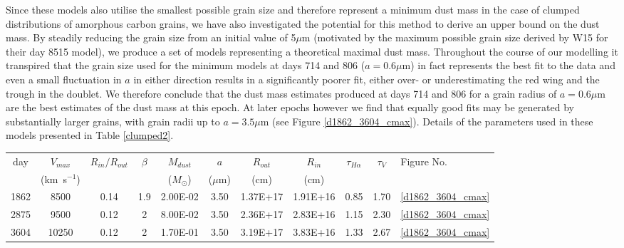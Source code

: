 Since these models also utilise the smallest possible grain size and 
therefore represent a minimum dust mass in the case of 
clumped distributions of amorphous carbon grains, we have also investigated the 
potential for this method to derive an upper bound on the dust mass.  By 
steadily reducing the grain size from an initial value of 5$\mu$m 
(motivated by the maximum possible grain size derived by W15 for their day 
8515 model), we produce a set of models representing a theoretical maximal 
dust mass.  Throughout the course of our modelling it transpired that the 
grain size used for the minimum models at days 714 and 806 ($a=0.6\mu$m) 
in fact represents the best fit to the data and even a small fluctuation 
in $a$ in either direction results in a significantly poorer fit, either 
over- or underestimating the red wing and the trough in the doublet.  We 
therefore conclude that the dust mass estimates produced at days 714 and 
806 for a grain radius of $a=0.6\mu$m are the best estimates of the dust mass 
at this epoch.  At later epochs however we find that equally good fits may 
be generated by substantially larger grains, with grain radii up to $a=3.5\mu$m (see Figure 
\ref{d1862_3604_cmax}).  Details of the parameters used in these models 
presented in Table \ref{clumped2}.



\begin{table*}
	\begin{minipage}{180mm}
	\caption{Details of the parameters used for the best fitting clumped models with $a=3.5\mu$m.}
	\label{clumped2}
	\begin{center}
  	\begin{tabular}{@{} ccccccccccl @{}}
    	\hline
  day & $V_{max}$ & $R_{in}/R_{out}$ & $\beta$ & $M_{dust}$ & $a$ & $R_{out}$ & $R_{in}$ & $\tau_{H\alpha}$ & $\tau_V$ & Figure No. \\
	& (km~s$^{-1} $) & & & ($M_{\odot}$) & ($\mu$m) & (cm) & (cm)  \\
	\hline
1862 & 8500 & 0.14 & 1.9 & 2.00E-02 & 3.50 & 1.37E+17 & 1.91E+16 & 0.85 & 1.70 & \ref{d1862_3604_cmax} \\
2875 & 9500 & 0.12 & 2 & 8.00E-02 & 3.50 & 2.36E+17 & 2.83E+16 & 1.15 & 2.30 & \ref{d1862_3604_cmax} \\
3604 & 10250 & 0.12 & 2 & 1.70E-01 & 3.50 & 3.19E+17 & 3.83E+16 & 1.33 & 2.67 & \ref{d1862_3604_cmax} \\
    \hline
  \end{tabular}
  \end{center}
\end{minipage}
\end{table*}


